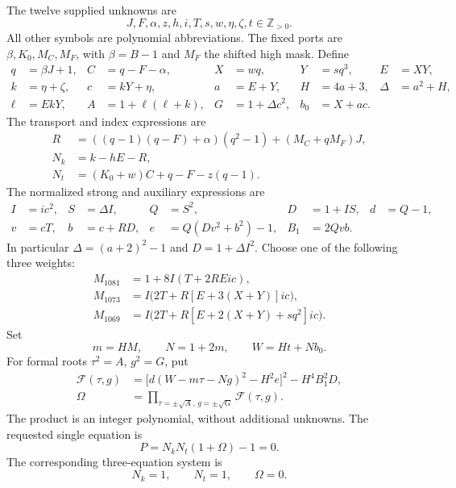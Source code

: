 \documentclass[11pt,letterpaper]{article}
\newcommand{\Z}{\mathbb Z}
\theoremstyle{remark}
\begin{document}
The twelve supplied unknowns are
\[
 J,F,\alpha,z,h,i,T,s,w,\eta,\zeta,t\in\Z_{>0}.
\]
All other symbols are polynomial abbreviations. The fixed ports are $\beta,K_0,M_C,M_F$, with $\beta=B-1$ and $M_F$ the shifted high
mask. Define
\begin{align*}
 q&=\beta J+1,& C&=q-F-\alpha,& X&=wq,& Y&=sq^3,& E&=XY,\\
 k&=\eta+\zeta,&c&=kY+\eta,&a&=E+Y,&H&=4a+3,&\Delta&=a^2+H,\\
 \ell&=EkY,& A&=1+\ell(\ell+k),&G&=1+\Delta c^2,&b_0&=X+ac.
\end{align*}
The transport and index expressions are
\begin{align*}
 R&=((q-1)(q-F)+\alpha)(q^2-1)+(M_C+qM_F)J,\\
 N_k&=k-hE-R,\\
 N_t&=(K_0+w)C+q-F-z(q-1).
\end{align*}
The normalized strong and auxiliary expressions are
\begin{align*}
 I&=ic^2,& S&=\Delta I,&Q&=S^2,&D&=1+IS,&d&=Q-1,\\
 v&=cT,& b&=c+RD,&e&=Q(Dv^2+b^2)-1,&B_1&=2Qvb.
\end{align*}
In particular $\Delta=(a+2)^2-1$ and $D=1+\Delta I^2$.
Choose one of the following three weights:
\begin{align}
 M_{1081}&=1+8I(T+2REic),\label{eq:m1081}\\
 M_{1073}&=I\bigl(2T+R[E+3(X+Y)]ic\bigr),\label{eq:m1073}\\
 M_{1069}&=I\bigl(2T+R[E+2(X+Y)+sq^2]ic\bigr).
 \label{eq:m1069}
\end{align}
Set
\[
 m=HM,\qquad N=1+2m,\qquad W=Ht+Nb_0.
\]
For formal roots $\tau^2=A$, $g^2=G$, put
\begin{align}
 \mathcal F(\tau,g)
 &=\bigl[d(W-m\tau-Ng)^2-H^2e\bigr]^2-H^4B_1^2D,
 \label{eq:formalF}\\
 \Omega&=\prod_{\tau=\pm\sqrt A,\,g=\pm\sqrt G}
                   \mathcal F(\tau,g).\label{eq:omega}
\end{align}
The product is an integer polynomial, without additional unknowns.
The requested single equation is
\begin{equation}
 \boxed{\quad P=N_kN_t(1+\Omega)-1=0.\quad}
 \label{eq:positiveP}
\end{equation}
The corresponding three-equation system is
\begin{equation}
 N_k=1,\qquad N_t=1,\qquad \Omega=0.
 \label{eq:positiveSystem}
\end{equation}
\end{document}
